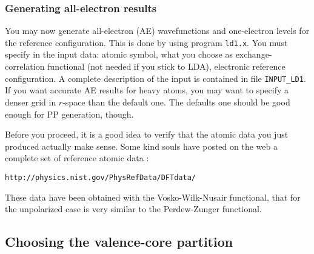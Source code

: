 \subsubsection{Generating all-electron results}

You may now generate all-electron (AE) wavefunctions and one-electron
levels for the reference configuration. This is done by using program
{\tt ld1.x}. You must specify in the input data: atomic symbol, what
you choose as exchange-correlation functional (not needed if you stick 
to LDA), electronic reference configuration.
A complete description of the input is contained in file
{\tt INPUT\_LD1}. If you want accurate AE results for heavy atoms,
you may want to specify a denser grid in $r$-space than the default
one. The defaults one should be good enough for PP generation, though.

Before you proceed, it is a good idea to verify that the atomic data
you just produced actually make sense. Some kind souls have posted on
the web a complete set of reference atomic data :

{\tt http://physics.nist.gov/PhysRefData/DFTdata/ }
\par\noindent
These data have been obtained with the Vosko-Wilk-Nusair functional,
that for the unpolarized case is very similar to the Perdew-Zunger 
functional.

\subsection{Choosing the valence-core partition}


